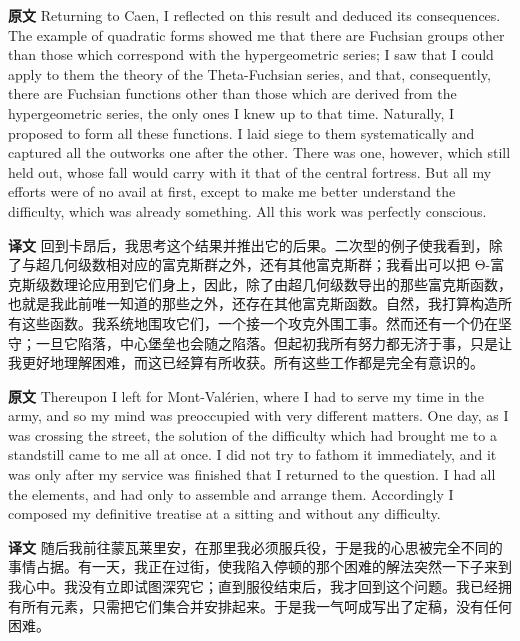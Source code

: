 \documentclass[UTF8,zihao=-4]{ctexart}
\newcommand{\BodyFont}{\fontsize{10.5pt}{15.5pt}\selectfont}
\newcommand{\origlabel}{\textbf{原文}\quad}
\newcommand{\translabel}{\textbf{译文}\quad}
\newenvironment{enblock}{\par\noindent\begingroup\BodyFont\origlabel}{\par\endgroup}
\newenvironment{zhblock}{\par\noindent\begingroup\BodyFont\translabel}{\par\endgroup\vspace{0.35em}}
\begin{document}
\begin{enblock}
Returning to Caen, I reflected on this result and deduced its consequences. The example of quadratic forms showed me that there are Fuchsian groups other than those which correspond with the hypergeometric series; I saw that I could apply to them the theory of the Theta-Fuchsian series, and that, consequently, there are Fuchsian functions other than those which are derived from the hypergeometric series, the only ones I knew up to that time. Naturally, I proposed to form all these functions. I laid siege to them systematically and captured all the outworks one after the other. There was one, however, which still held out, whose fall would carry with it that of the central fortress. But all my efforts were of no avail at first, except to make me better understand the difficulty, which was already something. All this work was perfectly conscious.
\end{enblock}
\begin{zhblock}
回到卡昂后，我思考这个结果并推出它的后果。二次型的例子使我看到，除了与超几何级数相对应的富克斯群之外，还有其他富克斯群；我看出可以把 Θ-富克斯级数理论应用到它们身上，因此，除了由超几何级数导出的那些富克斯函数，也就是我此前唯一知道的那些之外，还存在其他富克斯函数。自然，我打算构造所有这些函数。我系统地围攻它们，一个接一个攻克外围工事。然而还有一个仍在坚守；一旦它陷落，中心堡垒也会随之陷落。但起初我所有努力都无济于事，只是让我更好地理解困难，而这已经算有所收获。所有这些工作都是完全有意识的。\end{zhblock}

\begin{enblock}
Thereupon I left for Mont-Valérien, where I had to serve my time in the army, and so my mind was preoccupied with very different matters. One day, as I was crossing the street, the solution of the difficulty which had brought me to a standstill came to me all at once. I did not try to fathom it immediately, and it was only after my service was finished that I returned to the question. I had all the elements, and had only to assemble and arrange them. Accordingly I composed my definitive treatise at a sitting and without any difficulty.
\end{enblock}
\begin{zhblock}
随后我前往蒙瓦莱里安，在那里我必须服兵役，于是我的心思被完全不同的事情占据。有一天，我正在过街，使我陷入停顿的那个困难的解法突然一下子来到我心中。我没有立即试图深究它；直到服役结束后，我才回到这个问题。我已经拥有所有元素，只需把它们集合并安排起来。于是我一气呵成写出了定稿，没有任何困难。\end{zhblock}
\end{document}
